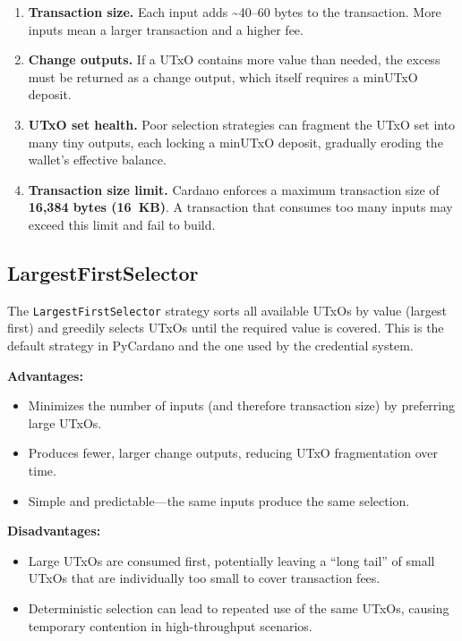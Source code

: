 \begin{enumerate}[nosep]
  \item \textbf{Transaction size.} Each input adds \textasciitilde40--60
    bytes to the transaction. More inputs mean a larger transaction and
    a higher fee.
  \item \textbf{Change outputs.} If a UTxO contains more value than
    needed, the excess must be returned as a change output, which itself
    requires a minUTxO deposit.
  \item \textbf{UTxO set health.} Poor selection strategies can
    fragment the UTxO set into many tiny outputs, each locking a minUTxO
    deposit, gradually eroding the wallet's effective balance.
  \item \textbf{Transaction size limit.} Cardano enforces a maximum
    transaction size of \textbf{16,384 bytes (16~KB)}. A transaction
    that consumes too many inputs may exceed this limit and fail to
    build.
\end{enumerate}

\subsection{LargestFirstSelector}

The \texttt{LargestFirstSelector} strategy sorts all available UTxOs by
value (largest first) and greedily selects UTxOs until the required
value is covered. This is the default strategy in PyCardano and the one
used by the credential system.

\textbf{Advantages:}
\begin{itemize}[nosep]
  \item Minimizes the number of inputs (and therefore transaction size)
    by preferring large UTxOs.
  \item Produces fewer, larger change outputs, reducing UTxO
    fragmentation over time.
  \item Simple and predictable---the same inputs produce the same
    selection.
\end{itemize}

\textbf{Disadvantages:}
\begin{itemize}[nosep]
  \item Large UTxOs are consumed first, potentially leaving a ``long
    tail'' of small UTxOs that are individually too small to cover
    transaction fees.
  \item Deterministic selection can lead to repeated use of the same
    UTxOs, causing temporary contention in high-throughput scenarios.
\end{itemize}


